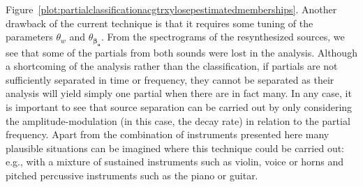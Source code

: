 Figure~\ref{plot:partialclassificationacgtrxylosepestimatedmemberships}. Another
drawback of the current technique is that it requires some tuning of the
parameters $\theta_{w}$ and $\theta_{\boldsymbol{\beta}_{\boldsymbol{a}}}$.
From the spectrograms of the resynthesized sources, we see that some of the
partials from both sounds were lost in the analysis.  Although a shortcoming of
the analysis rather than the classification, if partials are not sufficiently
separated in time or frequency, they cannot be separated as their analysis will
yield simply one partial when there are in fact many.
In any case, it is important
to see that source separation can be carried out by only considering the
amplitude-modulation (in this case, the decay rate) in relation to the partial
frequency. Apart from the combination of instruments presented here many
plausible situations can be imagined where this technique could be carried out:
e.g., with a mixture of sustained instruments such as violin, voice or horns and
pitched percussive instruments such as the piano or guitar.
